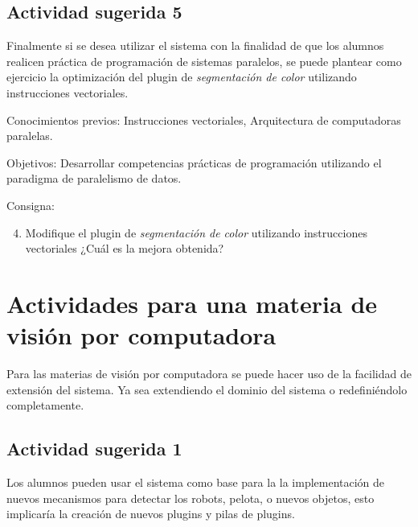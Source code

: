 \subsection{Actividad sugerida 5}

Finalmente si se desea utilizar el sistema con la finalidad de que los alumnos
realicen práctica de programación de sistemas paralelos, se puede plantear como
ejercicio la optimización del plugin de \emph{segmentación de color} utilizando
instrucciones vectoriales.

\begin{description}

	\item{Conocimientos previos}: Instrucciones vectoriales, Arquitectura de
		computadoras paralelas.

	\item{Objetivos}: Desarrollar competencias prácticas de programación
		utilizando el paradigma de paralelismo de datos.

	\item{Consigna}: \begin{enumerate}

	\setcounter{enumi}{3}

	\item{Modifique el plugin de \emph{segmentación de color} utilizando
	instrucciones vectoriales ¿Cuál es la mejora obtenida?}

\end{enumerate}

\end{description}

\section{Actividades para una materia de visión por computadora}

\label{eduvision}

Para las materias de visión por computadora se puede hacer uso de la facilidad
de extensión del sistema. Ya sea extendiendo el dominio del sistema o
redefiniéndolo completamente.

\subsection{Actividad sugerida 1}

Los alumnos pueden usar el sistema como base para la la implementación de nuevos
mecanismos para detectar los robots, pelota, o nuevos objetos, esto implicaría
la creación de nuevos plugins y pilas de plugins.

